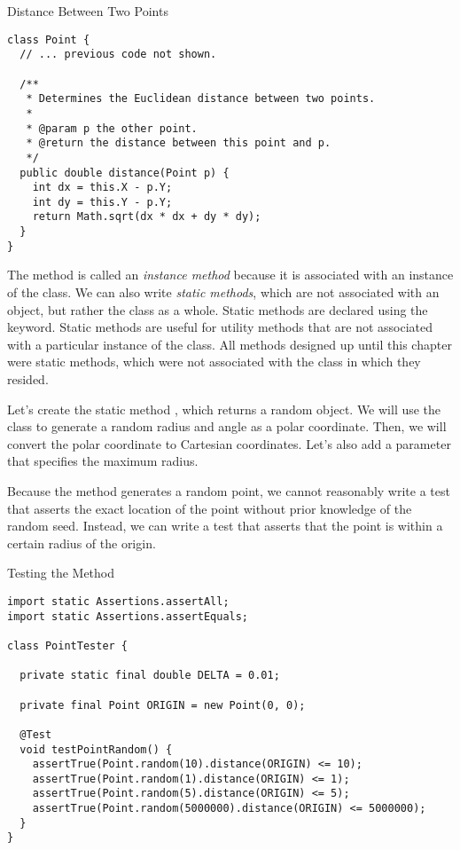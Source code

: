 \begin{cl}{Distance Between Two Points}
\begin{lstlisting}[language=MyJava]
class Point {
  // ... previous code not shown.

  /**
   * Determines the Euclidean distance between two points.
   * 
   * @param p the other point.
   * @return the distance between this point and p.
   */
  public double distance(Point p) {
    int dx = this.X - p.Y;
    int dy = this.Y - p.Y;
    return Math.sqrt(dx * dx + dy * dy);
  }
}
\end{lstlisting}
\end{cl}

The  method is called an \textit{instance method} because it is associated with an instance of the class. We can also write \textit{static methods}, which are not associated with an object, but rather the class as a whole. Static methods are declared using the  keyword. Static methods are useful for utility methods that are not associated with a particular instance of the class. All methods designed up until this chapter were static methods, which were not associated with the class in which they resided.

\example Let's create the static method , which returns a random  object. We will use the  class to generate a random radius and angle as a polar coordinate. Then, we will convert the polar coordinate to Cartesian coordinates. Let's also add a parameter that specifies the maximum radius.

Because the  method generates a random point, we cannot reasonably write a test that asserts the exact location of the point without prior knowledge of the random seed. Instead, we can write a test that asserts that the point is within a certain radius of the origin. 

\begin{cl}{Testing the  Method}
\begin{lstlisting}[language=MyJava]
import static Assertions.assertAll;
import static Assertions.assertEquals;

class PointTester {

  private static final double DELTA = 0.01;

  private final Point ORIGIN = new Point(0, 0);

  @Test
  void testPointRandom() {
    assertTrue(Point.random(10).distance(ORIGIN) <= 10);
    assertTrue(Point.random(1).distance(ORIGIN) <= 1);
    assertTrue(Point.random(5).distance(ORIGIN) <= 5);
    assertTrue(Point.random(5000000).distance(ORIGIN) <= 5000000);
  }
}
\end{lstlisting}
\end{cl}

